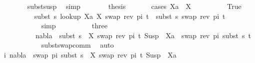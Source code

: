 \begin{isabellebody}
\ \ \ \ \ \ \isamarkupfalse%
\ subst{\isacharunderscore}{\kern0pt}susp\ \isamarkupfalse%
\ simp\isanewline
\ \ \ \ \isamarkupfalse%
\ \isamarkupfalse%
\ {\isacharquery}{\kern0pt}thesis\isanewline
\ \ \ \ \ \ \isamarkupfalse%
{\isacharparenleft}{\kern0pt}cases\ {\isachardoublequoteopen}Xa\ {\isacharequal}{\kern0pt}\ X{\isachardoublequoteclose}{\isacharparenright}{\kern0pt}\isanewline
\ \ \ \ \ \ \ \ \isamarkupfalse%
\ True\isanewline
\ \ \ \ \ \ \ \ \isamarkupfalse%
\ {\isachardoublequoteopen}subst\ s\ {\isacharparenleft}{\kern0pt}look{\isacharunderscore}{\kern0pt}up\ Xa\ {\isacharbrackleft}{\kern0pt}{\isacharparenleft}{\kern0pt}X{\isacharcomma}{\kern0pt}\ swap\ {\isacharparenleft}{\kern0pt}rev\ pi{\isacharparenright}{\kern0pt}\ t{\isacharparenright}{\kern0pt}{\isacharbrackright}{\kern0pt}{\isacharparenright}{\kern0pt}\ {\isacharequal}{\kern0pt}\ subst\ s\ {\isacharparenleft}{\kern0pt}swap\ {\isacharparenleft}{\kern0pt}rev\ pi{\isacharparenright}{\kern0pt}\ t{\isacharparenright}{\kern0pt}{\isachardoublequoteclose}\isanewline
\ \ \ \ \ \ \ \ \ \ \isamarkupfalse%
\ simp\isanewline
\ \ \ \ \ \ \ \ \isamarkupfalse%
\ three\ \isamarkupfalse%
\isanewline
\ \ \ \ \ \ \ \ \ \ {\isachardoublequoteopen}nabla\ {\isasymturnstile}\ subst\ {\isacharparenleft}{\kern0pt}s\ {\isasymbullet}\ {\isacharbrackleft}{\kern0pt}{\isacharparenleft}{\kern0pt}X{\isacharcomma}{\kern0pt}\ swap\ {\isacharparenleft}{\kern0pt}rev\ pi{\isacharparenright}{\kern0pt}\ t{\isacharparenright}{\kern0pt}{\isacharbrackright}{\kern0pt}{\isacharparenright}{\kern0pt}\ {\isacharparenleft}{\kern0pt}Susp\ {\isacharbrackleft}{\kern0pt}{\isacharbrackright}{\kern0pt}\ Xa{\isacharparenright}{\kern0pt}\ {\isasymapprox}\ swap\ {\isacharparenleft}{\kern0pt}rev\ pi{\isacharparenright}{\kern0pt}\ {\isacharparenleft}{\kern0pt}subst\ s\ t{\isacharparenright}{\kern0pt}{\isachardoublequoteclose}\isanewline
\ \ \ \ \ \ \ \ \ \ \isamarkupfalse%
\ subst{\isacharunderscore}{\kern0pt}swap{\isacharunderscore}{\kern0pt}comm\ \isamarkupfalse%
\ auto\isanewline
\ \ \ \ \ \ \ \ \isamarkupfalse%
\ i{\isacharcolon}{\kern0pt}\ {\isachardoublequoteopen}nabla\ {\isasymturnstile}\ swap\ pi\ {\isacharparenleft}{\kern0pt}subst\ {\isacharparenleft}{\kern0pt}s\ {\isasymbullet}\ {\isacharbrackleft}{\kern0pt}{\isacharparenleft}{\kern0pt}X{\isacharcomma}{\kern0pt}\ swap\ {\isacharparenleft}{\kern0pt}rev\ pi{\isacharparenright}{\kern0pt}\ t{\isacharparenright}{\kern0pt}{\isacharbrackright}{\kern0pt}{\isacharparenright}{\kern0pt}\ {\isacharparenleft}{\kern0pt}Susp\ {\isacharbrackleft}{\kern0pt}{\isacharbrackright}{\kern0pt}\ Xa{\isacharparenright}{\kern0pt}{\isacharparenright}{\kern0pt}\isanewline

\end{isabellebody}
